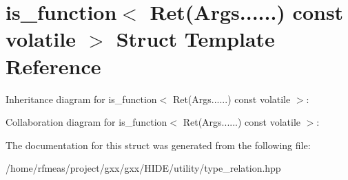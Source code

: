 \hypertarget{structis__function_3_01Ret_07Args_8_8_8_8_8_8_08_01const_01volatile_01_4}{}\section{is\+\_\+function$<$ Ret(Args......) const volatile $>$ Struct Template Reference}
\label{structis__function_3_01Ret_07Args_8_8_8_8_8_8_08_01const_01volatile_01_4}


Inheritance diagram for is\+\_\+function$<$ Ret(Args......) const volatile $>$\+:


Collaboration diagram for is\+\_\+function$<$ Ret(Args......) const volatile $>$\+:


The documentation for this struct was generated from the following file\+:\begin{DoxyCompactItemize}
\item 
/home/rfmeas/project/gxx/gxx/\+H\+I\+D\+E/utility/type\+\_\+relation.\+hpp\end{DoxyCompactItemize}
